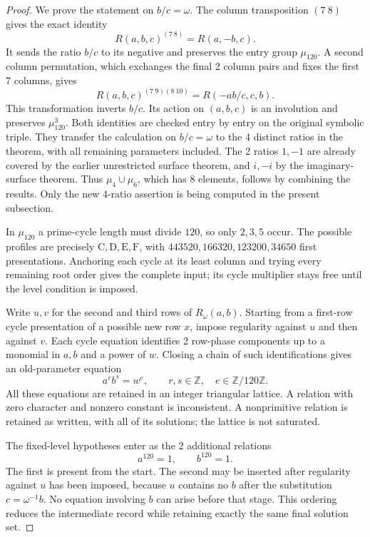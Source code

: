 \documentclass[11pt,a4paper]{article}
\theoremstyle{plain}
\theoremstyle{definition}
\theoremstyle{plain}
\begin{document}
\begin{proof}
We prove the statement on $b/c=\omega$. The column transposition $(7\ 8)$ gives the exact identity
\[
R(a,b,c)^{(7\ 8)}=R(a,-b,c).
\]
It sends the ratio $b/c$ to its negative and preserves the entry group $\mu_{120}$. A second column permutation, which exchanges the final 2 column pairs and fixes the first 7 columns, gives
\[
R(a,b,c)^{(7\ 9)(8\ 10)}=R(-ab/c,c,b).
\]
This transformation inverts $b/c$. Its action on $(a,b,c)$ is an involution and preserves $\mu_{120}^3$. Both identities are checked entry by entry on the original symbolic triple. They transfer the calculation on $b/c=\omega$ to the 4 distinct ratios in the theorem, with all remaining parameters included. The 2 ratios $1,-1$ are already covered by the earlier unrestricted surface theorem, and $i,-i$ by the imaginary-surface theorem. Thus $\mu_4\cup\mu_6$, which has 8 elements, follows by combining the results. Only the new 4-ratio assertion is being computed in the present subsection.

\medskip

In $\mu_{120}$ a prime-cycle length must divide $120$, so only $2,3,5$ occur. The possible profiles are precisely $\mathrm{C},\mathrm{D},\mathrm{E},\mathrm{F}$, with $443520,166320,123200,34650$ first presentations. Anchoring each cycle at its least column and trying every remaining root order gives the complete input; its cycle multiplier stays free until the level condition is imposed.

\medskip
Write $u,v$ for the second and third rows of $R_\omega(a,b)$. Starting from a first-row cycle presentation of a possible new row $x$, impose regularity against $u$ and then against $v$. Each cycle equation identifies 2 row-phase components up to a monomial in $a,b$ and a power of $w$. Closing a chain of such identifications gives an old-parameter equation
\[
a^r b^s=w^{e},
\qquad r,s\in\mathbb Z,\quad e\in\mathbb Z/120\mathbb Z.
\]
All these equations are retained in an integer triangular lattice. A relation with zero character and nonzero constant is inconsistent. A nonprimitive relation is retained as written, with all of its solutions; the lattice is not saturated.

The fixed-level hypotheses enter as the 2 additional relations
\[
a^{120}=1,\qquad b^{120}=1.
\]
The first is present from the start. The second may be inserted after regularity against $u$ has been imposed, because $u$ contains no $b$ after the substitution $c=\omega^{-1}b$. No equation involving $b$ can arise before that stage. This ordering reduces the intermediate record while retaining exactly the same final solution set.


\end{proof}
\end{document}
